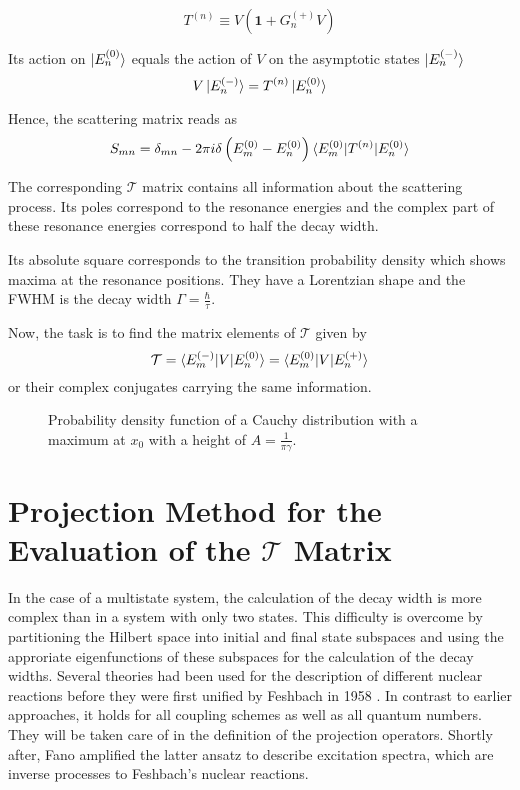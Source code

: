 \begin{equation}
 T^{(n)} \equiv V \left( \mathbf{1} + G_n^{(+)} V \right)
\end{equation}

Its action on $\ket{E_n^{(0)}}$ equals the action of $V$ on the asymptotic
states $\ket{E_n^{(-)}}$
\begin{equation}
 V \ket{E_n^{(-)}} = T^{(n)} \ket{E_n^{(0)}}
\end{equation}

Hence, the scattering matrix reads as
\begin{equation}
 S_{mn} = \delta_{mn} - 2\pi i \delta \left(E_m^{(0)} - E_n^{(0)} \right)
          \braket{E_m^{(0)}| T^{(n)} |E_n^{(0)}}
\end{equation}

The corresponding $\mathcal{T}$ matrix contains all information about the
scattering process. Its poles correspond to the resonance energies and
the complex part of these resonance energies correspond to half the decay width.

Its absolute square corresponds to the transition probability density
which shows maxima at the resonance positions. They have a Lorentzian shape
and the \ac{FWHM} is the decay width $\Gamma=\frac{\hbar}{\tau}$.

Now, the task is to find the matrix elements of $\mathcal{T}$ given by
\begin{equation}
 \mathcal{T} = \braket{E_m^{(-)}| V | E_n^{(0)}} = \braket{E_m^{(0)}| V |E_n^{(+)}}
\end{equation}
or their complex conjugates carrying the same information.



\begin{figure}[h]
  \centering
  
  \caption{Probability density function of a Cauchy distribution with a
           maximum at $x_0$ with a height of $A=\frac{1}{\pi\gamma}$.}
  \label{figure:general_resonance}
\end{figure}


\section{Projection Method for the Evaluation of the $\mathcal{T}$ Matrix}

In the case of a multistate system, the calculation of the decay width is more
complex than in a system with only two states.
This difficulty is overcome by partitioning the Hilbert space into initial and final
state subspaces and using the approriate eigenfunctions of these subspaces for the
calculation of the decay widths. 
Several theories had been used for the description of different nuclear reactions
before they were first unified by Feshbach in 1958 \cite{Feshbach58,Feshbach62,Feshbach_book}.
In contrast to earlier approaches, it holds for all coupling schemes as well as
all quantum numbers. They will be taken care of in the definition of the
projection operators.
Shortly after,
Fano amplified the latter ansatz to describe excitation spectra, which
are inverse processes to Feshbach's nuclear reactions.\cite{Fano61}


